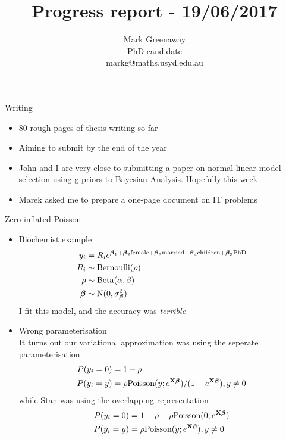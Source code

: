 \documentclass{beamer}
\title{Progress report - 19/06/2017}
\author{Mark Greenaway\\PhD candidate\\markg@maths.usyd.edu.au}
\begin{document}
\begin{frame}
\maketitle
\end{frame}

\begin{frame}{Writing}
\begin{itemize}
\item 80 rough pages of thesis writing so far
\item Aiming to submit by the end of the year
\item John and I are very close to submitting a paper on normal linear model selection using g-priors
to Bayesian Analysis. Hopefully this week
\item Marek asked me to prepare a one-page document on IT problems
\end{itemize}
\end{frame}

\begin{frame}{Zero-inflated Poisson}
\begin{itemize}
\item{Biochemist example}
\begin{align*}
y_i &= R_i e^{{\boldsymbol \beta}_1 + {\boldsymbol \beta}_2 \text{female} + {\boldsymbol \beta}_3 \text{married} + {\boldsymbol \beta}_4 \text{children} + {\boldsymbol \beta}_5 \text{PhD}} \\
R_i &\sim \text{Bernoulli} (\rho) \\
\rho &\sim \text{Beta}(\alpha, \beta) \\
{\boldsymbol \beta} &\sim \text{N}(0, \sigma_{\boldsymbol \beta}^2)
\end{align*}
I fit this model, and the accuracy was \emph{terrible}
\item Wrong parameterisation \\
It turns out our variational approximation was using the seperate parameterisation
\begin{align*}
P(y_i = 0) &= 1 - \rho \\
P(y_i = y) &= \rho \text{Poisson} (y; e^{{\bf X} {\boldsymbol \beta}})/(1 - e^{{\bf X} {\boldsymbol \beta}}), y \ne 0
\end{align*}
while Stan was using the overlapping representation
\begin{align*}
P(y_i = 0) &= 1 - \rho + \rho \text{Poisson} (0; e^{{\bf X} {\boldsymbol \beta}})\\
P(y_i = y) &= \rho \text{Poisson} (y; e^{{\bf X} {\boldsymbol \beta}}), y \ne 0
\end{align*}
\end{itemize}
\end{frame}
\end{document}
